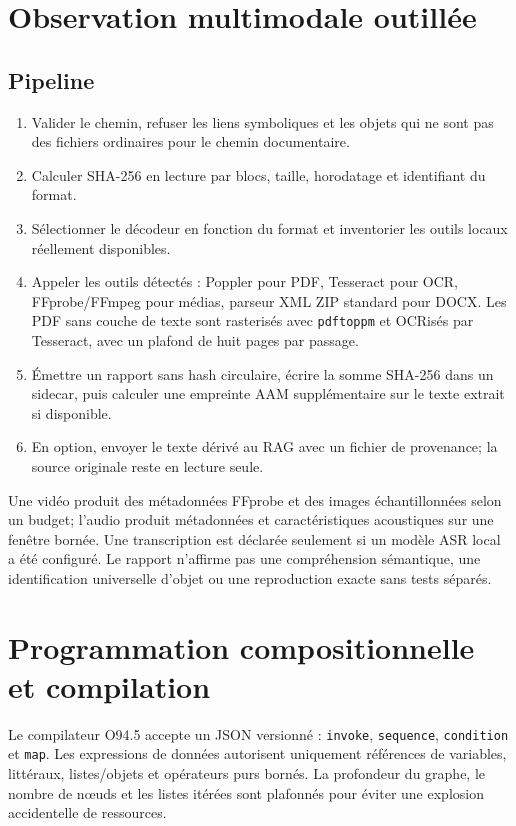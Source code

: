 \documentclass[11pt,a4paper]{article}
\begin{document}
\section{Observation multimodale outillée}
\subsection{Pipeline}
\begin{enumerate}
\item Valider le chemin, refuser les liens symboliques et les objets qui ne sont pas des fichiers ordinaires pour le chemin documentaire.
\item Calculer SHA-256 en lecture par blocs, taille, horodatage et identifiant du format.
\item Sélectionner le décodeur en fonction du format et inventorier les outils locaux réellement disponibles.
\item Appeler les outils détectés : Poppler pour PDF, Tesseract pour OCR, FFprobe/FFmpeg pour médias, parseur XML ZIP standard pour DOCX. Les PDF sans couche de texte sont rasterisés avec \texttt{pdftoppm} et OCRisés par Tesseract, avec un plafond de huit pages par passage.
\item Émettre un rapport sans hash circulaire, écrire la somme SHA-256 dans un sidecar, puis calculer une empreinte AAM supplémentaire sur le texte extrait si disponible.
\item En option, envoyer le texte dérivé au RAG avec un fichier de provenance; la source originale reste en lecture seule.
\end{enumerate}
Une vidéo produit des métadonnées FFprobe et des images échantillonnées selon un budget; l'audio produit métadonnées et caractéristiques acoustiques sur une fenêtre bornée. Une transcription est déclarée seulement si un modèle ASR local a été configuré. Le rapport n'affirme pas une compréhension sémantique, une identification universelle d'objet ou une reproduction exacte sans tests séparés.

\section{Programmation compositionnelle et compilation}
Le compilateur O94.5 accepte un JSON versionné : \texttt{invoke}, \texttt{sequence}, \texttt{condition} et \texttt{map}. Les expressions de données autorisent uniquement références de variables, littéraux, listes/objets et opérateurs purs bornés. La profondeur du graphe, le nombre de nœuds et les listes itérées sont plafonnés pour éviter une explosion accidentelle de ressources.
\end{document}
